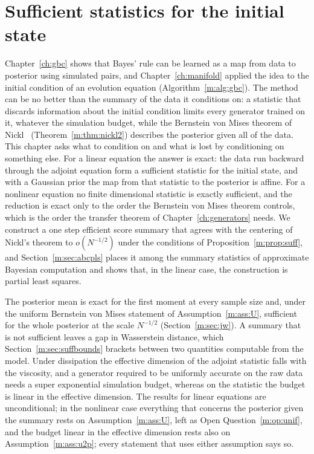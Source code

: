 \section{Sufficient statistics for the initial state}\label{m:sec:suff}

Chapter~\ref{ch:gbc} shows that Bayes' rule can be learned as a map from data to posterior using simulated pairs, and Chapter~\ref{ch:manifold} applied the idea to the initial condition of an evolution equation (Algorithm~\ref{m:alg:gbc}). The method can be no better than the summary of the data it conditions on: a statistic that discards information about the initial condition limits every generator trained on it, whatever the simulation budget, while the Bernstein von Mises theorem of Nickl~\cite{nicklbvm2024} (Theorem~\ref{m:thm:nickl2}) describes the posterior given all of the data. This chapter asks what to condition on and what is lost by conditioning on something else. For a linear equation the answer is exact: the data run backward through the adjoint equation form a sufficient statistic for the initial state, and with a Gaussian prior the map from that statistic to the posterior is affine. For a nonlinear equation no finite dimensional statistic is exactly sufficient, and the reduction is exact only to the order the Bernstein von Mises theorem controls, which is the order the transfer theorem of Chapter~\ref{ch:generators} needs. We construct a one step efficient score summary that agrees with the centering of Nickl's theorem to $o(N^{-1/2})$ under the conditions of Proposition~\ref{m:prop:suff}, and Section~\ref{m:sec:abcpls} places it among the summary statistics of approximate Bayesian computation and shows that, in the linear case, the construction is partial least squares.

The posterior mean is exact for the first moment at every sample size and, under the uniform Bernstein von Mises statement of Assumption~\ref{m:ass:U}, sufficient for the whole posterior at the scale $N^{-1/2}$ (Section~\ref{m:sec:jw}). A summary that is not sufficient leaves a gap in Wasserstein distance, which Section~\ref{m:sec:suffbounds} brackets between two quantities computable from the model. Under dissipation the effective dimension of the adjoint statistic falls with the viscosity, and a generator required to be uniformly accurate on the raw data needs a super exponential simulation budget, whereas on the statistic the budget is linear in the effective dimension. The results for linear equations are unconditional; in the nonlinear case everything that concerns the posterior given the summary rests on Assumption~\ref{m:ass:U}, left as Open Question~\ref{m:op:unif}, and the budget linear in the effective dimension rests also on Assumption~\ref{m:ass:u2p}; every statement that uses either assumption says so.

